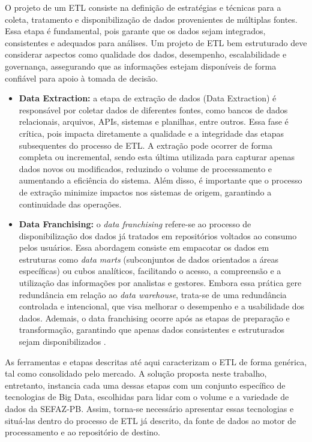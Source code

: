 O projeto de um ETL consiste na definição de estratégias e técnicas para a coleta, 
tratamento e disponibilização de dados provenientes de múltiplas fontes. Essa etapa é 
fundamental, pois garante que os dados sejam integrados, consistentes e adequados para 
análises. Um projeto de ETL bem estruturado deve considerar aspectos como qualidade dos dados, 
desempenho, escalabilidade e governança, assegurando que as informações estejam disponíveis de 
forma confiável para apoio à tomada de decisão.

\begin{itemize}
    \item \textbf{Data Extraction:} a etapa de extração de dados (Data Extraction) é responsável por 
    coletar dados de diferentes fontes, como bancos de dados relacionais, arquivos, APIs,
    sistemas e planilhas, entre outros. Essa fase é crítica, pois impacta diretamente a qualidade e a 
    integridade das etapas subsequentes do processo de ETL. A extração pode ocorrer de forma 
    completa ou incremental, sendo esta última utilizada para capturar apenas dados novos ou 
    modificados, reduzindo o volume de processamento e aumentando a eficiência do sistema. 
    Além disso, é importante que o processo de extração minimize impactos nos sistemas de 
    origem, garantindo a continuidade das operações.

    \item \textbf{Data Franchising:} o \textit{data franchising} refere-se ao processo de disponibilização dos 
    dados já tratados em repositórios voltados ao consumo pelos usuários. Essa abordagem 
    consiste em empacotar os dados em estruturas como \textit{data marts} (subconjuntos de dados 
    orientados a áreas específicas) ou cubos analíticos, facilitando o acesso, a compreensão 
    e a utilização das informações por analistas e gestores. Embora essa prática gere
    redundância em relação ao \textit{data warehouse}, trata-se de uma redundância controlada e 
    intencional, que visa melhorar o desempenho e a usabilidade dos dados. Ademais, o data 
    franchising ocorre após as etapas de preparação e transformação, garantindo que apenas
    dados consistentes e estruturados sejam disponibilizados \cite{sherman2015business}.

\end{itemize}

As ferramentas e etapas descritas até aqui caracterizam o ETL de forma genérica, tal
como consolidado pelo mercado. A solução proposta neste trabalho, entretanto, instancia
cada uma dessas etapas com um conjunto específico de tecnologias de Big Data, escolhidas
para lidar com o volume e a variedade de dados da SEFAZ-PB. Assim, torna-se necessário
apresentar essas tecnologias e situá-las dentro do processo de ETL já descrito, da fonte
de dados ao motor de processamento e ao repositório de destino.

